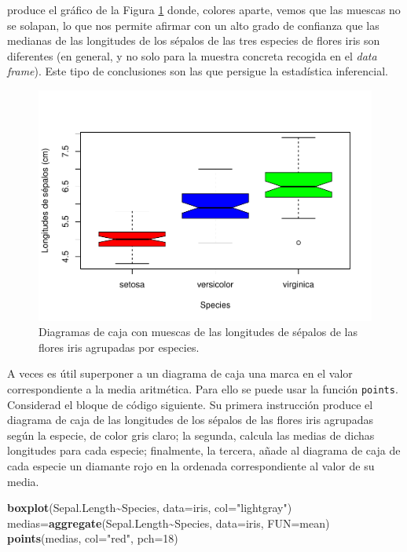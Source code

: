 \documentclass[
]{book}
\newenvironment{Shaded}{\begin{snugshade}}{\end{snugshade}}
\newcommand{\DataTypeTok}[1]{\textcolor[rgb]{0.13,0.29,0.53}{#1}}
\newcommand{\DecValTok}[1]{\textcolor[rgb]{0.00,0.00,0.81}{#1}}
\newcommand{\KeywordTok}[1]{\textcolor[rgb]{0.13,0.29,0.53}{\textbf{#1}}}
\newcommand{\NormalTok}[1]{#1}
\newcommand{\OperatorTok}[1]{\textcolor[rgb]{0.81,0.36,0.00}{\textbf{#1}}}
\newcommand{\StringTok}[1]{\textcolor[rgb]{0.31,0.60,0.02}{#1}}
\theoremstyle{definition}
\theoremstyle{definition}
\theoremstyle{definition}
\theoremstyle{remark}
\begin{document}
produce el gráfico de la Figura \ref{fig:notch} donde, colores aparte, vemos que las muescas no se solapan, lo que nos permite afirmar con un alto grado de confianza que las medianas de las longitudes de los sépalos de las tres especies de flores iris son diferentes (en general, y no solo para la muestra concreta recogida en el \emph{data frame}). Este tipo de conclusiones son las que persigue la estadística inferencial.

\begin{figure}

{\centering \includegraphics[width=0.9\linewidth]{12chap12_Descripcion_cuantitativos_files/figure-latex/notch-1} 

}

\caption{Diagramas de caja con muescas de las longitudes de sépalos de las flores iris agrupadas por especies.}\label{fig:notch}
\end{figure}

A veces es útil superponer a un diagrama de caja una marca en el valor correspondiente a la media aritmética. Para ello se puede usar la función \texttt{points}. Considerad el bloque de código siguiente. Su primera instrucción produce el diagrama de caja de las longitudes de los sépalos de las flores iris agrupadas según la especie, de color gris claro; la segunda, calcula las medias de dichas longitudes para cada especie; finalmente, la tercera, añade al diagrama de caja de cada especie un diamante rojo en la ordenada correspondiente al valor de su media.

\begin{Shaded}
\begin{Highlighting}[]
\KeywordTok{boxplot}\NormalTok{(Sepal.Length}\OperatorTok{\textasciitilde{}}\NormalTok{Species, }\DataTypeTok{data=}\NormalTok{iris, }\DataTypeTok{col=}\StringTok{"lightgray"}\NormalTok{)}
\NormalTok{medias=}\KeywordTok{aggregate}\NormalTok{(Sepal.Length}\OperatorTok{\textasciitilde{}}\NormalTok{Species, }\DataTypeTok{data=}\NormalTok{iris, }\DataTypeTok{FUN=}\NormalTok{mean)}
\KeywordTok{points}\NormalTok{(medias, }\DataTypeTok{col=}\StringTok{"red"}\NormalTok{, }\DataTypeTok{pch=}\DecValTok{18}\NormalTok{)}
\end{Highlighting}
\end{Shaded}
\end{document}
